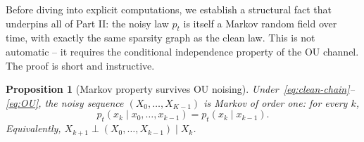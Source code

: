 \documentclass[11pt,a4paper,openany]{book}
\theoremstyle{plainserif}
\newtheorem{proposition}[theorem]{Proposition}
\theoremstyle{definition}
\theoremstyle{remarkstyle}
\begin{document}
Before diving into explicit computations, we establish a structural fact
that underpins all of Part II: the noisy law $p_t$ is itself a Markov
random field over time, with exactly the same sparsity graph as the clean
law. This is not automatic -- it requires the conditional independence
property of the OU channel. The proof is short and instructive.

\label{sec:markov-survives}
\begin{proposition}[Markov property survives OU noising]
\label{prop:markov-survives}
Under~\eqref{eq:clean-chain}--\eqref{eq:OU}, the noisy sequence
$(X_0, \ldots, X_{K-1})$ is Markov of order one: for every $k$,
\begin{equation}
p_t(x_k \mid x_0, \ldots, x_{k-1}) = p_t(x_k \mid x_{k-1}).
\label{eq:noisy-markov}
\end{equation}
Equivalently, $X_{k+1} \perp (X_0, \ldots, X_{k-1}) \mid X_k$.
\end{proposition}
\end{document}
